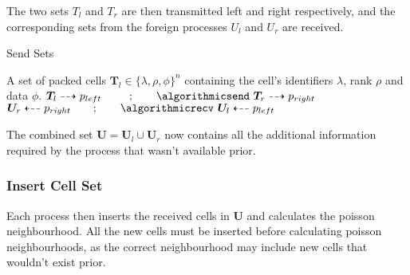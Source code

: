 \documentclass[twoside]{IIBproject}
\newcommand{\vect} [1] {\bm{#1}}
\newcommand{\dra}{\dashrightarrow}
\newcommand{\dla}{\dashleftarrow}
\numberwithin{figure}{section}
\begin{document}
            The two sets $T_l$ and $T_r$ are then transmitted left and right respectively, and the corresponding sets from the foreign processes $U_l$ and $U_r$ are received.

            \begin{algorithm}[H]
                \caption{Send Sets}
                \label{alg:rebalance-sendsets}

                \begin{algorithmic}
                    \Require A set of packed cells $\vect{T}_l \in \{\lambda, \rho, \phi\}^n$ containing the cell's identifiers $\lambda$, rank $\rho$ and data $\phi$.
                    \Statex
                    \Send $\vect{T}_l \dra p_{left} \qquad\ \,;\qquad \algorithmicsend\ \vect{T}_r \dra p_{right}$
                    \Recv $\vect{U}_r \dla p_{right} \qquad;\qquad \algorithmicrecv\ \vect{U}_l \dla p_{left}$
                \end{algorithmic}
            \end{algorithm}

            The combined set $\vect{U}=\vect{U}_l\cup\vect{U}_r$ now contains all the additional information required by the process that wasn't available prior.



        \subsubsection{Insert Cell Set} %
            \label{sec:rebalancing-insertcells}

            Each process then inserts the received cells in $\vect{U}$ and calculates the poisson neighbourhood. All the new cells must be inserted before calculating poisson neighbourhoods, as the correct neighbourhood may include new cells that wouldn't exist prior.
\end{document}
